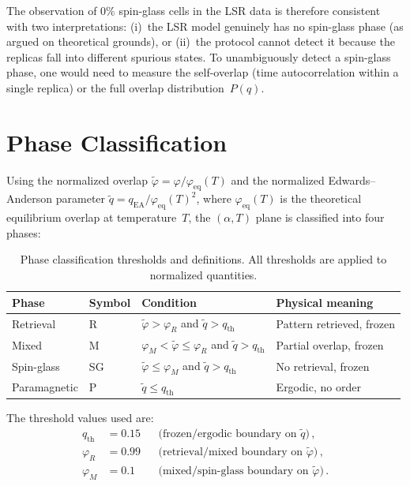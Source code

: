 \documentclass[11pt]{article}
\begin{document}
The observation of 0\% spin-glass cells in the LSR data is therefore consistent with two interpretations: (i)~the LSR model genuinely has no spin-glass phase (as argued on theoretical grounds), or (ii)~the protocol cannot detect it because the replicas fall into different spurious states.
To unambiguously detect a spin-glass phase, one would need to measure the self-overlap (time autocorrelation within a single replica) or the full overlap distribution~$P(q)$.

\section{Phase Classification}
\label{sec:phases}

Using the normalized overlap $\tilde\varphi = \varphi / \varphi_{\mathrm{eq}}(T)$ and the normalized Edwards--Anderson parameter $\tilde q = q_{\mathrm{EA}} / \varphi_{\mathrm{eq}}(T)^2$, where $\varphi_{\mathrm{eq}}(T)$ is the theoretical equilibrium overlap at temperature~$T$, the $(\alpha, T)$ plane is classified into four phases:

\begin{table}[h]
\centering
\caption{Phase classification thresholds and definitions. All thresholds are applied to normalized quantities.}
\label{tab:phases}
\begin{tabular}{llll}
\toprule
Phase & Symbol & Condition & Physical meaning \\
\midrule
Retrieval      & R  & $\tilde\varphi > \varphi_R$ and $\tilde q > q_{\mathrm{th}}$ & Pattern retrieved, frozen \\
Mixed          & M  & $\varphi_M < \tilde\varphi \le \varphi_R$ and $\tilde q > q_{\mathrm{th}}$ & Partial overlap, frozen \\
Spin-glass     & SG & $\tilde\varphi \le \varphi_M$ and $\tilde q > q_{\mathrm{th}}$ & No retrieval, frozen \\
Paramagnetic   & P  & $\tilde q \le q_{\mathrm{th}}$ & Ergodic, no order \\
\bottomrule
\end{tabular}
\end{table}

\noindent
The threshold values used are:
\begin{align}
    q_{\mathrm{th}} &= 0.15  && \text{(frozen/ergodic boundary on } \tilde q\text{)}\,,\\
    \varphi_R &= 0.99  && \text{(retrieval/mixed boundary on } \tilde\varphi\text{)}\,,\\
    \varphi_M &= 0.1   && \text{(mixed/spin-glass boundary on } \tilde\varphi\text{)}\,.
\end{align}
\end{document}
